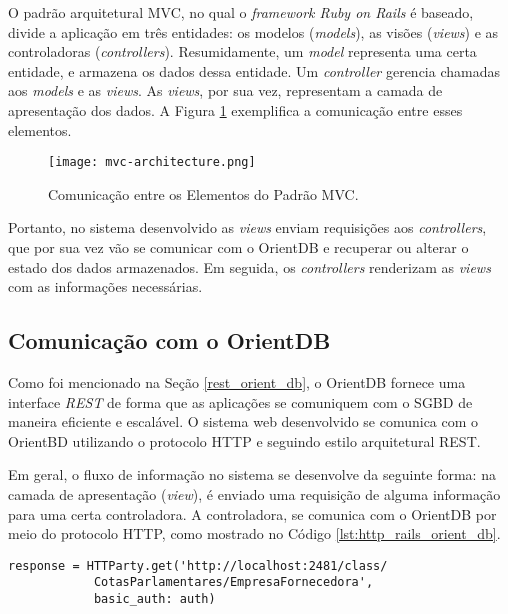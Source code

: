 	O padrão arquitetural MVC, no qual o \textit{framework Ruby on Rails} é baseado, divide a aplicação em três entidades: os modelos (\textit{models}), as visões (\textit{views}) e as controladoras (\textit{controllers}). Resumidamente, um \textit{model} representa uma certa entidade, e armazena os dados dessa entidade. Um \textit{controller} gerencia chamadas aos \textit{models} e as \textit{views}. As \textit{views}, por sua vez, representam a camada de apresentação dos dados. A Figura \ref{fig:mvc} exemplifica a comunicação entre esses elementos.
	
\begin{figure}[H]
\centering
\texttt{[image: mvc-architecture.png]}
\caption{Comunicação entre os Elementos do Padrão MVC.}
\label{fig:mvc}
\end{figure}

Portanto, no sistema desenvolvido as \textit{views} enviam requisições aos \textit{controllers}, que por sua vez vão se comunicar com o OrientDB e recuperar ou alterar o estado dos dados armazenados. Em seguida, os \textit{controllers} renderizam as \textit{views} com as informações necessárias.

\subsection{Comunicação com o OrientDB} \label{orient-communication}

	Como foi mencionado na Seção \ref{rest_orient_db}, o OrientDB fornece uma interface \textit{REST} de forma que as aplicações se comuniquem com o SGBD de maneira eficiente e escalável. O sistema web desenvolvido se comunica com o OrientBD utilizando o protocolo HTTP e seguindo estilo arquitetural REST.
	
	Em geral, o fluxo de informação no sistema se desenvolve da seguinte forma: na camada de apresentação (\textit{view}), é enviado uma requisição de alguma informação para uma certa controladora. A controladora, se comunica com o OrientDB por meio do protocolo HTTP, como mostrado no Código \ref{lst:http_rails_orient_db}.

\begin{lstlisting}[label={lst:http_rails_orient_db}, caption={Exemplo de Consulta no OrientDB para Retornar Informações da Classe de Empresas Fornecedoras.},captionpos=b]
response = HTTParty.get('http://localhost:2481/class/
			CotasParlamentares/EmpresaFornecedora', 
			basic_auth: auth)
\end{lstlisting}

